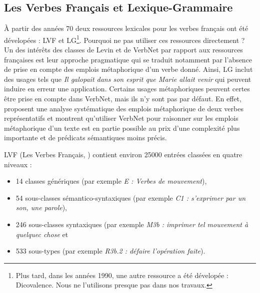 
\subsection{Les Verbes Français et Lexique-Grammaire}
\label{sec:lvflg}

À partir des années 70 deux ressources lexicales pour les verbes français ont
été dévelopées : LVF et LG\footnote{Plus tard, dans les années 1990, une autre
    ressource a été dévelopée : Dicovalence. Nous ne l'utilisons presque pas
dans nos travaux.}. Pourquoi ne pas utiliser ces ressources directement ?  Un
des intérêts des classes de Levin et de VerbNet par rapport aux ressources
françaises est leur approche pragmatique qui se traduit notamment par l'absence
de prise en compte des emplois métaphorique d'un verbe donné. Ainsi, LG inclut
des usages tels que \textit{Il galopait dans son esprit que Marie allait venir}
qui peuvent induire en erreur une application.  Certains usages métaphoriques
peuvent certes être prise en compte dans VerbNet, mais ils n'y sont pas par
défaut. En effet, \cite{brown2012semantic} proposent une analyse systématique
des emplois métaphorique de deux verbes représentatifs et montrent qu'utiliser
VerbNet pour raisonner sur les emplois métaphorique d'un texte est en partie
possible au prix d'une complexité plus importante et de prédicats sémantiques
moins précis.

LVF (Les Verbes Français, \cite{dubois1997verbes}) contient environ 25000
entrées classées en quatre niveaux :

\begin{itemize}

    \item 14 classes génériques (par exemple \emph{E : Verbes de mouvement}),

    \item 54 sous-classes sémantico-syntaxiques (par exemple \emph{C1 :
        s'exprimer par un son, une parole}),

    \item 246 sous-classes syntaxiques (par exemple \emph{M3b : imprimer tel
        mouvement à quelquec chose} et

    \item 533 sous-types (par exemple \emph{R3b.2 : défaire l'opération
        faite}).

\end{itemize}

